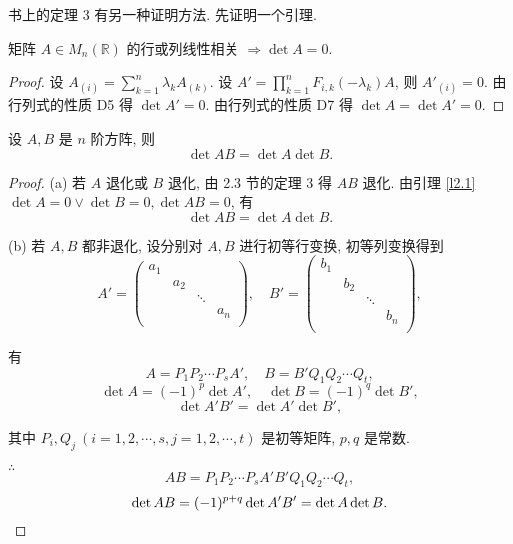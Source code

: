 \documentclass{ctexart}
\begin{document}
书上的定理 3 有另一种证明方法. 先证明一个引理.
\begin{lemma}\label{l2.1}
    矩阵 $A\in M_n(\mathbb{R})$ 的行或列线性相关 $\Rightarrow\det A=0$.
\end{lemma}
\begin{proof}
    设 $A_{(i)}=\sum\limits_{k=1}^n\lambda_kA_{(k)}$. 设 $A'=\prod\limits_{k=1}^nF_{i,k}(-\lambda_{k})A$, 则 $A'_{(i)}=0$. 由行列式的性质 D5 得 $\det A'=0$. 由行列式的性质 D7 得 $\det A=\det A'=0.$
\end{proof}
\begin{theorem}[书上的定理 3]
    设 $A,B$ 是 $n$ 阶方阵, 则
    \[\det AB=\det A\det B.\]
\end{theorem}
\begin{proof}
    (a) 若 $A$ 退化或 $B$ 退化, 由 2.3 节的定理 3 得 $AB$ 退化. 由引理 \ref{l2.1} $\det A=0\vee\det B=0,\det AB=0$, 有
    \[\det AB=\det A\det B.\]

    (b) 若 $A,B$ 都非退化, 设分别对 $A,B$ 进行初等行变换, 初等列变换得到
    \[A'=\begin{pmatrix}
        a_{1} \\
        & a_{2} \\
        && \ddots \\
        &&& a_{n} \\
    \end{pmatrix},\quad B'=\begin{pmatrix}
        b_{1} \\
        & b_{2} \\
        && \ddots \\
        &&& b_{n} \\
    \end{pmatrix},\]

    有
    \[A=P_1P_2\cdots P_sA',\quad B=B'Q_1Q_2\cdots Q_t,\]
    \[\det A=(-1)^p\det A',\quad\det B=(-1)^q\det B',\]
    \[\det A'B'=\det A'\det B',\]

    其中 $P_i,Q_j\ (i=1,2,\cdots,s,j=1,2,\cdots,t)$ 是初等矩阵, $p,q$ 是常数.

    $\therefore$
    \[AB=P_1P_2\cdots P_sA'B'Q_1Q_2\cdots Q_t,\]
    \[\det AB=(-1)^{p+q}\det A'B'=\det A\det B.\qedhere\]
\end{proof}
\end{document}
